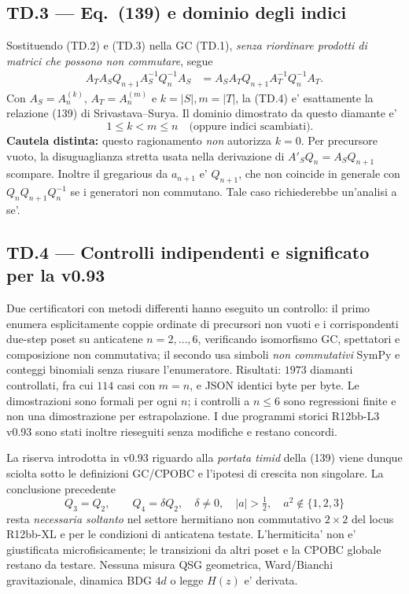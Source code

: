 \documentclass[11pt,a4paper]{article}
\begin{document}
\subsection*{TD.3 --- Eq.~(139) e dominio degli indici}
Sostituendo (TD.2) e (TD.3) nella GC (TD.1), \emph{senza riordinare prodotti di matrici che possono non commutare}, segue
\begin{equation}
\boxed{\begin{aligned}
 A_T A_S Q_{n+1}A_S^{-1}Q_n^{-1}A_S
 &=A_S A_T Q_{n+1}A_T^{-1}Q_n^{-1}A_T.
\end{aligned}}\tag{TD.4}
\end{equation}
Con $A_S=A_n^{(k)}$, $A_T=A_n^{(m)}$ e $k=|S|,m=|T|$, la (TD.4) e' esattamente la relazione (139) di Srivastava--Surya. Il dominio dimostrato da questo diamante e'
\begin{equation}
 \boxed{\quad 1\le k<m\le n\quad\text{(oppure indici scambiati).}}\tag{TD.5}
\end{equation}
\textbf{Cautela distinta:} questo ragionamento \emph{non} autorizza $k=0$. Per precursore vuoto, la disuguaglianza stretta usata nella derivazione di $A'_SQ_n=A_SQ_{n+1}$ scompare. Inoltre il gregarious da $a_{n+1}$ e' $Q_{n+1}$, che non coincide in generale con $Q_nQ_{n+1}Q_n^{-1}$ se i generatori non commutano. Tale caso richiederebbe un'analisi a se'.

\subsection*{TD.4 --- Controlli indipendenti e significato per la v0.93}
Due certificatori con metodi differenti hanno eseguito un controllo: il primo enumera esplicitamente coppie ordinate di precursori non vuoti e i corrispondenti due-step poset su anticatene $n=2,\ldots,6$, verificando isomorfismo GC, spettatori e composizione non commutativa; il secondo usa simboli \emph{non commutativi} SymPy e conteggi binomiali senza riusare l'enumeratore. Risultati: $1973$ diamanti controllati, fra cui $114$ casi con $m=n$, e JSON identici byte per byte. Le dimostrazioni sono formali per ogni $n$; i controlli a $n\le6$ sono regressioni finite e non una dimostrazione per estrapolazione. I due programmi storici R12bb-L3 v0.93 sono stati inoltre rieseguiti senza modifiche e restano concordi.

La riserva introdotta in v0.93 riguardo alla \emph{portata timid} della (139) viene dunque sciolta sotto le definizioni GC/CPOBC e l'ipotesi di crescita non singolare. La conclusione precedente
\begin{equation}
 Q_3=Q_2,\qquad Q_4=\delta Q_2,\quad \delta\ne0,\quad
 |a|>\tfrac12,\quad a^2\notin\{1,2,3\}\tag{TD.6}
\end{equation}
resta \emph{necessaria soltanto} nel settore hermitiano non commutativo $2\times2$ del locus R12bb-XL e per le condizioni di anticatena testate. L'hermiticita' non e' giustificata microfisicamente; le transizioni da altri poset e la CPOBC globale restano da testare. Nessuna misura QSG geometrica, Ward/Bianchi gravitazionale, dinamica BDG $4d$ o legge $H(z)$ e' derivata.
\end{document}

